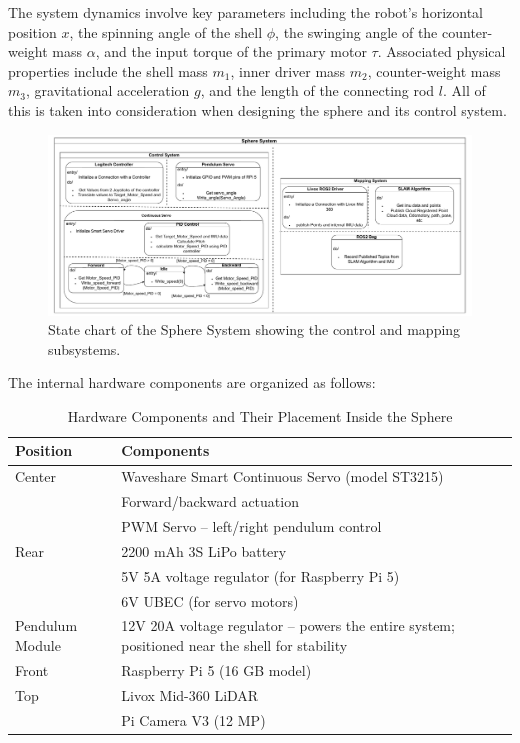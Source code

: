 \documentclass[conference]{IEEEtran}
\begin{document}
The system dynamics involve key parameters including the robot’s horizontal position \( x \), the spinning angle of the shell \( \phi \), the swinging angle of the counter-weight mass \( \alpha \), and the input torque of the primary motor \( \tau \). Associated physical properties include the shell mass \( m_1 \), inner driver mass \( m_2 \), counter-weight mass \( m_3 \), gravitational acceleration \( g \), and the length of the connecting rod \( l \). All of this is taken into consideration when designing the sphere and its control system.
\\

\begin{figure}[!t]
    \centering
    \includegraphics[width=1\linewidth]{pics/Khonsu.pdf} 
    \caption{State chart of the Sphere System showing the control and mapping subsystems.}
    \label{fig:sphere_system}
\end{figure}

The internal hardware components are organized as follows:

\begin{table}[H]
\centering
\caption{Hardware Components and Their Placement Inside the Sphere}
\label{tab:hardware_components}
\begin{tabularx}{\linewidth}{@{}l X@{}}
\toprule
\textbf{Position} & \textbf{Components} \\
\midrule
Center & Waveshare Smart Continuous Servo (model ST3215) \\
       & Forward/backward actuation \\
       & PWM Servo – left/right pendulum control \\
Rear   & 2200 mAh 3S LiPo battery \\
       & 5V 5A voltage regulator (for Raspberry Pi 5) \\
       & 6V UBEC (for servo motors) \\
Pendulum Module & 12V 20A voltage regulator – powers the entire system; positioned near the shell for stability \\
Front  & Raspberry Pi 5 (16 GB model) \\
Top    & Livox Mid-360 LiDAR \\
       & Pi Camera V3 (12 MP) \\
\bottomrule
\end{tabularx}
\end{table}
\end{document}
